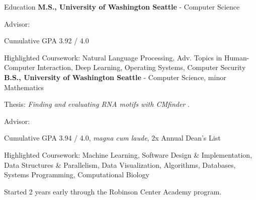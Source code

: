 \begin{rubric}{Education}
	\textbf{M.S., University of Washington Seattle} - Computer Science
    \par Advisor: \pWeldD{}
    \par Cumulative GPA 3.92 / 4.0
    \par Highlighted Coursework: Natural Language Processing, Adv. Topics in Human-Computer Interaction, Deep Learning, Operating Systems, Computer Security
\entry*[2016 -- 2019] %
	\textbf{B.S., University of Washington Seattle} - Computer Science, minor Mathematics
	\par Thesis: \emph{Finding and evaluating RNA motifs with CMfinder} \cite{zhou2019thesis}.
	\par Advisor: \pRuzzoL{}
	\par Cumulative GPA 3.94 / 4.0, \textit{magna cum laude}, 2x Annual Dean's List
	\par Highlighted Coursework: Machine Learning, Software Design \& Implementation, Data Structures \& Parallelism, Data Visualization, Algorithms, Databases, Systems Programming, Computational Biology
	\par Started 2 years early through the Robinson Center Academy program.
\end{rubric}